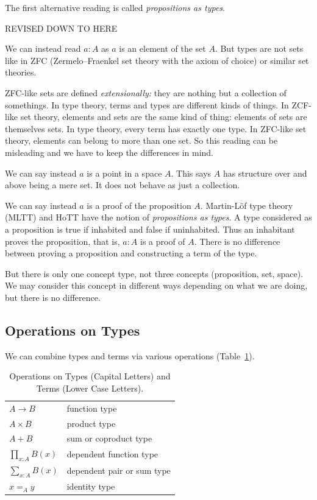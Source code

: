 \documentclass[11pt]{article}
\newcommand{\REVISED}{\begin{center} \LARGE REVISED DOWN TO HERE \end{center}}
\begin{document}
The first alternative reading is called \emph{propositions as types}.
\REVISED
We can instead read $a : A$ as $a$ is an element of the set $A$.
But types are not sets like in ZFC (Zermelo–Fraenkel set theory with
the axiom of choice) or similar set theories. 

ZFC-like sets are defined \emph{extensionally:} they are nothing but
a collection of somethings.  In type theory, terms and types are different
kinds of things.  In ZCF-like set theory, elements and sets are the same
kind of thing: elements of sets are themselves sets.  In type theory,
every term has exactly one type.  In ZFC-like set theory, elements can
belong to more than one set.  So this reading can be misleading and we
have to keep the differences in mind.

We can say instead $a$ is a point in a space $A$.  This says $A$ has structure
over and above being a mere set.  It does not behave as just a collection.

We can say instead $a$ is a proof of the proposition $A$.
Martin-L\"{o}f type theory (MLTT) \citep{martin-lof-mltt}
and HoTT have the notion of
\emph{propositions as types}.  A type considered as a proposition is true
if inhabited and false if uninhabited.  Thus an inhabitant proves
the proposition, that is, $a : A$ is a proof of $A$.
There is no difference between proving a proposition and constructing a
term of the type.

But there is only one concept type, not three concepts (proposition, set,
space).  We may consider this concept in different ways depending on what
we are doing, but there is no difference.

\subsection{Operations on Types}

We can combine types and terms via various operations
(Table~\ref{tab:operations}).
\begin{table}
\begin{center}
\begin{tabular}{ll}
$A \to B$ & function type \\
$A \times B$ & product type \\
$A + B$ & sum or coproduct type \\
$\prod_{x : A} B(x)$ & dependent function type \\
$\sum_{x : A} B(x)$ & dependent pair or sum type \\
$x =_A y$ & identity type
\end{tabular}
\end{center}
\caption{Operations on Types (Capital Letters) and Terms (Lower Case Letters).}
\label{tab:operations}
\end{table}
\end{document}
